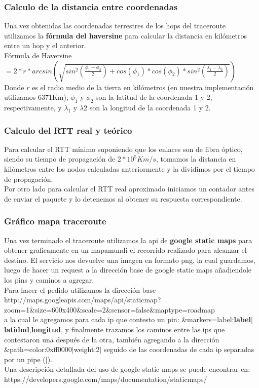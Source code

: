 \subsubsection{Calculo de la distancia entre coordenadas}

Una vez obtenidas las coordenadas terrestres de los hops del traceroute utilizamos la \textbf{fórmula del haversine} para calcular la distancia en kilómetros entre un hop y el anterior.	\\
Fórmula de Haversine $ = 2 * r * arcsin \left (\sqrt{sin^{2} \left (\frac{\phi_{1}-\phi_{2}}{2}\right ) + cos(\phi_{1}) * cos(\phi_{2}) * sin^{2} \left (\frac{\lambda_{1}-\lambda_{2}}{2}\right )}\right )$	\\
Donde $r$ es el radio medio de la tierra en kilómetros (en nuestra implementación utilizamos 6371Km), $\phi_{1}$ y $\phi_{2}$ son la latitud de la coordenada 1 y 2, respectivamente, y $\lambda_{1}$ y $\lambda{2}$ son la longitud de la coordenada 1 y 2.

\subsubsection{Calculo del RTT real y teórico}

Para calcular el RTT mínimo suponiendo que los enlaces son de fibra óptico, siendo su tiempo de propagación de $2*10^{5}Km/s$, tomamos la distancia en kilómetros entre los nodos calculadas anteriormente y la dividimos por el tiempo de propagación.	\\
\indent Por otro lado para calcular el RTT real aproximado iniciamos un contador antes de enviar el paquete y lo detenemos al obtener su respuesta correspondiente.

\subsubsection{Gráfico mapa traceroute}

Una vez terminado el traceroute utilizamos la api de \textbf{google static maps} para obtener graficamente en un mapamundi el recorrido realizado para alcanzar el destino. El servicio nos devuelve una imagen en formato png, la cual guardamos, luego de hacer un request a la dirección base de google static maps añadiendole los pins y caminos a agregar.	\\
\indent	Para hacer el pedido utilizamos la dirección base \\http://maps.googleapis.com/maps/api/staticmap?zoom=1\&size=600x400\&scale=2\&sensor=false\&maptype=roadmap	\\
 a la cual le agregamos para cada ip que contesto un pin: \&markers=label:\textbf{label}$|$\textbf{latidud},\textbf{longitud}, y finalmente trazamos los caminos entre las ips que contestaron una después de la otra, también agregando a la dirección \\ \&path=color:0xff0000$|$weight:2$|$ seguido de las coordenadas de cada ip separadas por un pipe ($|$).	\\
\indent Una descripción detallada del uso de google static maps se puede encontrar en: \\ https://developers.google.com/maps/documentation/staticmaps/
